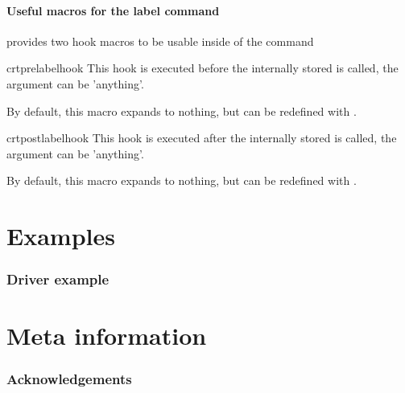 \documentclass[12pt,a4paper,oneside]{article}
\makeatletter
\newcommand{\chdocextractversion}[1]{%
  \@nameuse{#1}%
}
\makeatother
\begin{document}
\subsection{Useful macros for the label command}

 provides two hook macros to be usable inside of the  command

\begin{docCommand}[doc new={\chdocextractversion{crossreftoolsversion0.4}}]{crtprelabelhook}{}
This hook is executed before the internally stored  is called, the argument can be 'anything'. 

By default, this macro expands to nothing, but can be redefined with . 

\end{docCommand}

\begin{docCommand}[doc new={\chdocextractversion{crossreftoolsversion0.4}}]{crtpostlabelhook}{}
This hook is executed after the internally stored  is called, the argument can be 'anything'. 

By default, this macro expands to nothing, but can be redefined with . 

\end{docCommand}


\clearpage
\part{Examples}

\parttoc

\section{Driver example}





\clearpage
\part{Meta information}

\section{Acknowledgements} \label{section::acknowledgements}
\end{document}
